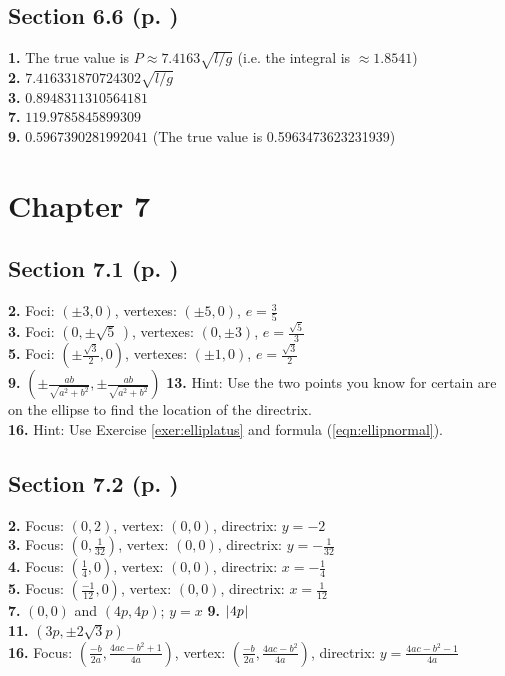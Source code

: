 \begin{multicols*}{2}
\subsection*{Section 6.6 (p. \pageref{sec6dot6})}
\textbf{1.} The true value is $P \approx 7.4163 \sqrt{l/g}$ (i.e. the integral is $\approx 1.8541$)\\
\textbf{2.} $7.416331870724302 \sqrt{l/g}$\\
\textbf{3.} $0.8948311310564181$\\
\textbf{7.} $119.9785845899309$\\
\textbf{9.} $0.5967390281992041$ (The true value is 0.5963473623231939)
\section*{Chapter 7}
\subsection*{Section 7.1 (p. \pageref{sec7dot1})}
\textbf{2.} Foci: $(\pm 3,0)$, vertexes: $(\pm 5,0)$, $e=\frac{3}{5}$\\
\textbf{3.} Foci: $(0,\pm \sqrt{5}\,)$, vertexes: $(0,\pm 3)$, $e=\frac{\sqrt{5}}{3}$\\
\textbf{5.} Foci: $\left(\pm \frac{\sqrt{3}}{2},0\right)$, vertexes: $(\pm 1,0)$, $e=\frac{\sqrt{3}}{2}$\\
\textbf{9.} $\left(\pm \frac{a b}{\sqrt{a^2 + b^2}},\pm \frac{a b}{\sqrt{a^2 + b^2}}\right)$ \quad
\textbf{13.} Hint: Use the two points you know for certain are on the ellipse to find the
location of the directrix.\\
\textbf{16.} Hint: Use Exercise \ref{exer:elliplatus} and formula (\ref{eqn:ellipnormal}).
\subsection*{Section 7.2 (p. \pageref{sec7dot2})}
\textbf{2.} Focus: $(0,2)$, vertex: $(0,0)$, directrix: $y=-2$\\
\textbf{3.} Focus: $\left(0,\frac{1}{32}\right)$, vertex: $(0,0)$, directrix: $y=-\frac{1}{32}$\\
\textbf{4.} Focus: $\left(\frac{1}{4},0\right)$, vertex: $(0,0)$, directrix: $x=-\frac{1}{4}$\\
\textbf{5.} Focus: $\left(\frac{-1}{12},0\right)$, vertex: $(0,0)$, directrix: $x=\frac{1}{12}$\\
\textbf{7.} $(0,0)$ and $(4p,4p)$; $y=x$ \quad
\textbf{9.} $\lvert\mspace{1mu}4p\mspace{1mu}\rvert$\\
\textbf{11.} $(3p,\pm 2\sqrt{3}p)$\\
\textbf{16.} Focus: $\left(\frac{-b}{2a},\frac{4ac - b^2 +1}{4a}\right)$,
vertex: $\left(\frac{-b}{2a},\frac{4ac - b^2}{4a}\right)$, directrix: $y=\frac{4ac - b^2 -1}{4a}$

\end{multicols*}
